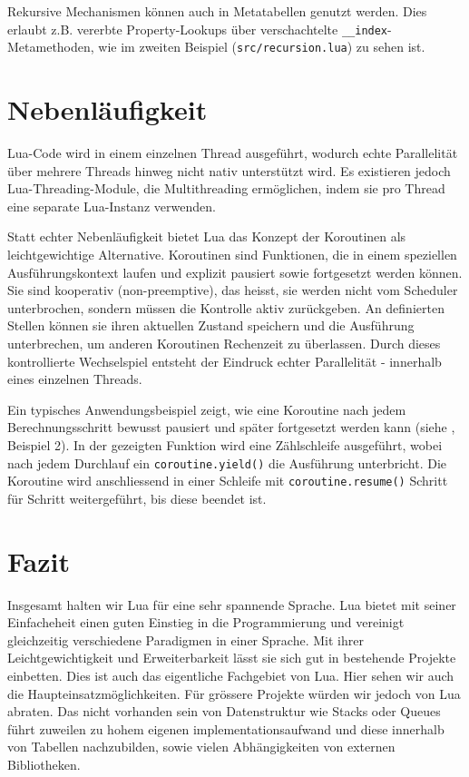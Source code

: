 \documentclass[11pt,a4paper]{article}
\begin{document}
Rekursive Mechanismen können auch in Metatabellen genutzt werden.
Dies erlaubt z.B. vererbte Property-Lookups über verschachtelte \texttt{\_\_index}-Metamethoden, wie im zweiten Beispiel (\texttt{src/recursion.lua}) zu sehen ist.

\section*{Nebenläufigkeit}

Lua-Code wird in einem einzelnen Thread ausgeführt, wodurch echte Parallelität über mehrere Threads hinweg nicht nativ unterstützt wird.
Es existieren jedoch Lua-Threading-Module, die Multithreading ermöglichen, indem sie pro Thread eine separate Lua-Instanz verwenden.

Statt echter Nebenläufigkeit bietet Lua das Konzept der Koroutinen als leichtgewichtige Alternative.
Koroutinen sind Funktionen, die in einem speziellen Ausführungskontext laufen und explizit pausiert sowie fortgesetzt werden können.
Sie sind kooperativ (non-preemptive), das heisst, sie werden nicht vom Scheduler unterbrochen, sondern müssen die Kontrolle aktiv zurückgeben.
An definierten Stellen können sie ihren aktuellen Zustand speichern und die Ausführung unterbrechen, um anderen Koroutinen Rechenzeit zu überlassen.
Durch dieses kontrollierte Wechselspiel entsteht der Eindruck echter Parallelität - innerhalb eines einzelnen Threads.

Ein typisches Anwendungsbeispiel zeigt, wie eine Koroutine nach jedem Berechnungsschritt bewusst pausiert und später fortgesetzt werden kann (siehe , Beispiel 2).
In der gezeigten Funktion wird eine Zählschleife ausgeführt, wobei nach jedem Durchlauf ein \lstinline|coroutine.yield()| die Ausführung unterbricht.
Die Koroutine wird anschliessend in einer Schleife mit \lstinline|coroutine.resume()| Schritt für Schritt weitergeführt, bis diese beendet ist.

\section*{Fazit}
Insgesamt halten wir Lua für eine sehr spannende Sprache. Lua bietet mit seiner Einfacheheit einen guten Einstieg in die Programmierung und vereinigt gleichzeitig verschiedene Paradigmen in einer Sprache.
Mit ihrer Leichtgewichtigkeit und Erweiterbarkeit lässt sie sich gut in bestehende Projekte einbetten. Dies ist auch das eigentliche Fachgebiet von Lua.
Hier sehen wir auch die Haupteinsatzmöglichkeiten. Für grössere Projekte würden wir jedoch von Lua abraten. Das nicht vorhanden sein von Datenstruktur wie Stacks oder Queues führt zuweilen zu hohem eigenen implementationsaufwand und diese innerhalb von Tabellen nachzubilden, sowie vielen Abhängigkeiten von externen Bibliotheken.
\end{document}
